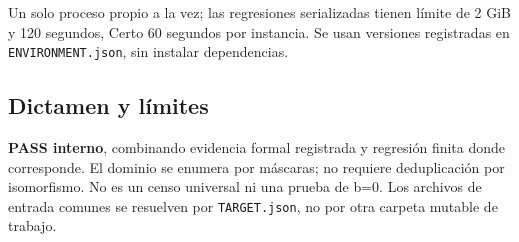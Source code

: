 Un solo proceso propio a la vez; las regresiones serializadas tienen
límite de 2 GiB y 120 segundos, Certo 60 segundos por instancia. Se usan
versiones registradas en \texttt{ENVIRONMENT.json}, sin instalar
dependencias.

\subsection{Dictamen y límites}\label{dictamen-y-luxedmites}

\textbf{PASS interno}, combinando evidencia formal registrada y
regresión finita donde corresponde. El dominio se enumera por máscaras;
no requiere deduplicación por isomorfismo. No es un censo universal ni
una prueba de b=0. Los archivos de entrada comunes se resuelven por
\texttt{TARGET.json}, no por otra carpeta mutable de trabajo.
